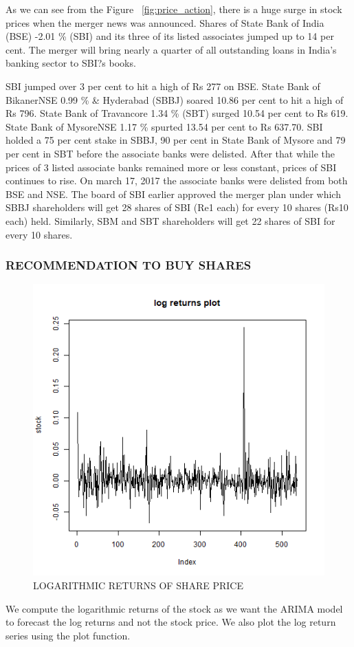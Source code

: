 \documentclass[a4paper, 12pt]{extarticle}
\begin{document}
{\par As we can see from the Figure ~\ref{fig:price_action}, there is a huge surge in stock prices when the merger news was announced. Shares of State Bank of India (BSE) -2.01 \% (SBI) and its three of its listed associates jumped up to 14 per cent. The merger will bring nearly a quarter of all outstanding loans in India's banking sector to SBI?s books.

SBI jumped over 3 per cent to hit a high of Rs 277 on BSE. State Bank of BikanerNSE 0.99 \% \& Hyderabad (SBBJ) soared 10.86 per cent to hit a high of Rs 796. State Bank of Travancore 1.34 \% (SBT) surged 10.54 per cent to Rs 619. State Bank of MysoreNSE 1.17 \% spurted 13.54 per cent to Rs 637.70. SBI holded a 75 per cent stake in SBBJ, 90 per cent in State Bank of Mysore and 79 per cent in SBT before the associate banks were delisted. After that while the prices of 3 listed associate banks remained more or less constant, prices of SBI continues to rise. On march 17, 2017 the associate banks were delisted from both BSE and NSE. The board of SBI earlier approved the merger plan under which SBBJ shareholders will get 28 shares of SBI (Re1 each) for every 10 shares (Rs10 each) held. Similarly, SBM and SBT shareholders will get 22 shares of SBI for every 10 shares.

\subsubsection{RECOMMENDATION TO BUY SHARES}
\begin{figure}[H]
\centering
\includegraphics[scale=0.8]{log_returns.png}
\caption{LOGARITHMIC RETURNS OF SHARE PRICE}
\label{fig:log_returns}
\end{figure}
We compute the logarithmic returns of the stock as we want the ARIMA model to forecast the log returns and not the stock price. We also plot the log return series using the plot function.

}
\end{document}
